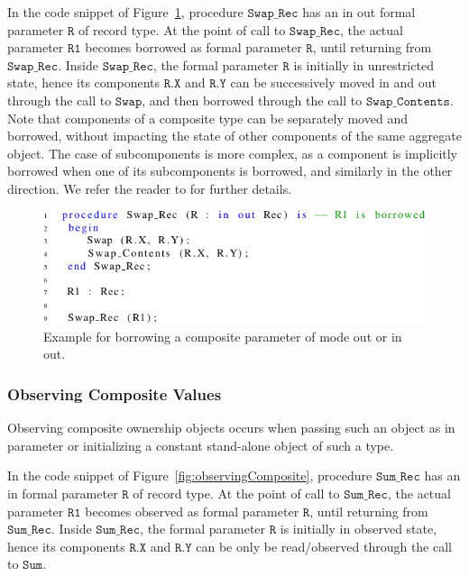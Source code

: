 \documentclass{llncs}
\newcommand\var[1]{\ensuremath{\mathtt{#1}}}
\newcommand{\keyword}[1]{\textsf{#1}}
\begin{document}
In the code snippet of Figure~\ref{fig:borrowingComposite}, procedure \var{Swap\_Rec} has an \keyword{in out} formal parameter \var{R} of record type. At the point of
call to \var{Swap\_Rec}, the actual parameter \var{R1} becomes borrowed as formal parameter \var{R}, until returning from \var{Swap\_Rec}. Inside \var{Swap\_Rec}, the formal parameter \var{R} is initially
in unrestricted state, hence its components \var{R.X} and \var{R.Y} can be successively moved in and out through the call to \var{Swap}, and then borrowed through the call to \var{Swap\_Contents}.
Note that components of a composite type can be separately moved and borrowed, without impacting the state of other components of the same aggregate object.
The case of subcomponents is more complex, as a component is implicitly borrowed when one of its subcomponents is borrowed, and similarly in the other direction.
We refer the reader to \cite{AI2017} for further details.

\begin{figure}[htb!]
\centering
   \includegraphics[]{borrowingComposite}
   \caption{Example for borrowing a composite parameter of mode \keyword{out} or \keyword{in out}.}
   \label{fig:borrowingComposite}
\end{figure}

   
\subsubsection{Observing Composite Values}
\label{subsubsec:extendingBorrowing}

Observing composite ownership objects occurs when passing such an object as \keyword{in} parameter or initializing a constant stand-alone object of such a type. 

In the code snippet of Figure~\ref{fig:observingComposite}, procedure \var{Sum\_Rec} has an \keyword{in} formal parameter \var{R} of record type.
At the point of call to \var{Sum\_Rec}, the actual parameter \var{R1} becomes observed as formal parameter \var{R}, until returning from \var{Sum\_Rec}. Inside \var{Sum\_Rec},
the formal parameter \var{R} is initially in observed state, hence its components \var{R.X} and \var{R.Y} can be only be read/observed through the call to \var{Sum}.
\end{document}
